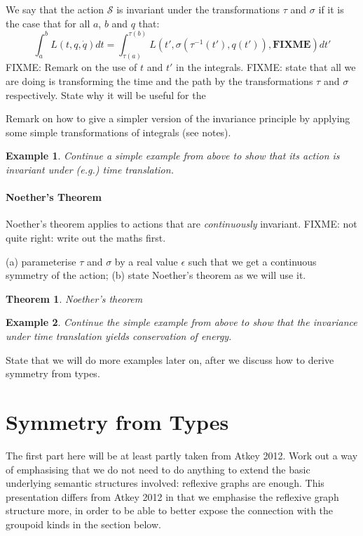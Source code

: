 \documentclass[preprint]{sigplanconf}
\newtheorem{theorem}{Theorem}
\theoremstyle{examplestyle}
\newtheorem{example}{Example}
\begin{document}
We say that the action $\mathcal{S}$ is invariant under the
transformations $\tau$ and $\sigma$ if it is the case that for all
$a$, $b$ and $q$ that:
\begin{displaymath}
  \int_a^b L(t,q,\dot{q}) \mathit{dt} = \int_{\tau(a)}^{\tau(b)} L(t', \sigma(\tau^{-1}(t'), q(t')), \mathbf{FIXME}) \mathit{dt'}
\end{displaymath}
FIXME: Remark on the use of $t$ and $t'$ in the integrals. FIXME:
state that all we are doing is transforming the time and the path by
the transformations $\tau$ and $\sigma$ respectively. State why it
will be useful for the 

Remark on how to give a simpler version of the invariance principle by
applying some simple transformations of integrals (see notes).

\begin{example}
  Continue a simple example from above to show that its action is
  invariant under (e.g.) time translation.
\end{example}

\paragraph{Noether's Theorem} Noether's theorem applies to actions
that are \emph{continuously} invariant. FIXME: not quite right: write
out the maths first.

(a) parameterise $\tau$ and $\sigma$ by a real value $\epsilon$ such
that we get a continuous symmetry of the action; (b) state Noether's
theorem as we will use it.

\begin{theorem}
  Noether's theorem
\end{theorem}

\begin{example}
  Continue the simple example from above to show that the invariance
  under time translation yields conservation of energy.
\end{example}

State that we will do more examples later on, after we discuss how to
derive symmetry from types.

\section{Symmetry from Types}

The first part here will be at least partly taken from Atkey
2012. Work out a way of emphasising that we do not need to do anything
to extend the basic underlying semantic structures involved: reflexive
graphs are enough. This presentation differs from Atkey 2012 in that
we emphasise the reflexive graph structure more, in order to be able
to better expose the connection with the groupoid kinds in the section
below.
\end{document}
